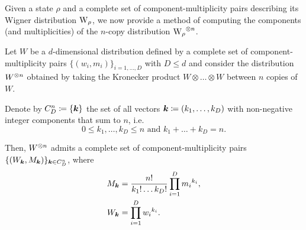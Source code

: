 \documentclass[pra,
aps,
twocolumn,
superscriptaddress,
groupedaddress,
nofootinbib,
reprint
]{revtex4-1}
\begin{document}
Given a state $\rho$ and a complete set of component-multiplicity pairs describing its Wigner distribution $\W{\rho}$, we now provide a method of computing the components (and multiplicities) of the $n$-copy distribution $\W{\rho}\too{n}$.
\begin{lemma}\label{lem:ncopycomponents}
	Let $W$ be a $d$-dimensional distribution defined by a complete set of component-multiplicity pairs $\{(w_i, m_i)\}_{i=1,\dots,D}$ with $D \leq d$ and consider the distribution $W^{\otimes n}$ obtained by taking the Kronecker product $W \otimes \dots \otimes W$ between $n$ copies of $W$.
	
	Denote by $C_D^n \coloneqq \{\bm{k}\}$ the set of all vectors $\bm{k} \coloneqq (k_1, \dots, k_D)$ with non-negative integer components that sum to $n$, i.e.
	\begin{equation*}
	0 \leq k_1, \dots, k_D \leq n \text{ and } k_1 + \dots + k_D = n.
	\end{equation*}
	
	Then, $W^{\otimes n}$ admits a complete set of component-multiplicity pairs $\{(W_{\bm{k}}, M_{\bm{k}})\}_{\bm{k} \in C_D^n}$, where
\begin{align}
	M_{\bm{k}} &= \frac{n!}{k_1!\dots k_D!} \prod\limits_{i=1}^D {m_i}^{k_i}, \label{eq:M}\\
	W_{\bm{k}} &= \prod\limits_{i=1}^D {w_i}^{k_i}. \label{eq:W}
\end{align}
\end{lemma}
\end{document}
